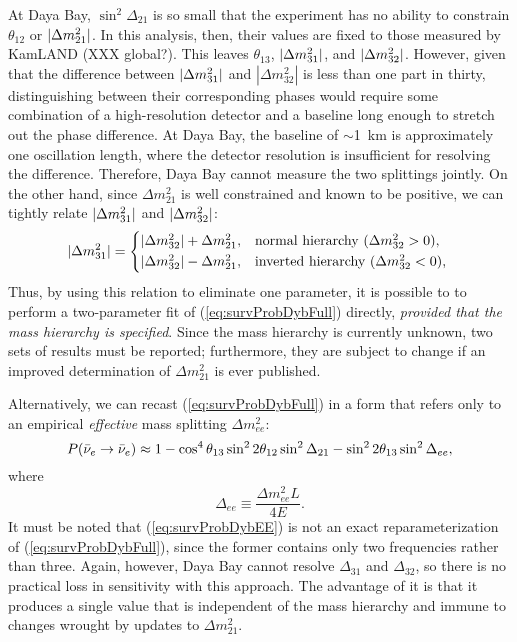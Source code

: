 \documentclass[../thesis.tex]{subfiles}
\begin{document}
At Daya Bay, $\sin^2 \Delta_{21}$ is so small that the experiment has no ability to constrain $\theta_{12}$ or $\lvert \Delta m^2_{21}\rvert$. In this analysis, then, their values are fixed to those measured by KamLAND (XXX global?). This leaves $\theta_{13}$, $\lvert \Delta m^2_{31}\rvert$, and $\lvert \Delta m^2_{32}\rvert$. However, given that the difference between $\lvert \Delta m^2_{31}\rvert$ and $|\Delta m^2_{32}|$ is less than one part in thirty, distinguishing between their corresponding phases would require some combination of a high-resolution detector and a baseline long enough to stretch out the phase difference. At Daya Bay, the baseline of $\sim$1~km is approximately one oscillation length, where the detector resolution is insufficient for resolving the difference. Therefore, Daya Bay cannot measure the two splittings jointly. On the other hand, since $\Delta m^2_{21}$ is well constrained and known to be positive, we can tightly relate $\lvert \Delta m^2_{31}\rvert$ and $\lvert \Delta m^2_{32}\rvert$:
\[ \abs{\Delta m^2_{31}} =
  \begin{cases*}
    \abs{\Delta m^2_{32}} + \Delta m^2_{21}, & normal hierarchy ($\Delta m^2_{32} > 0$), \\
    \abs{\Delta m^2_{32}} - \Delta m^2_{21}, & inverted hierarchy ($\Delta m^2_{32} < 0$), \\
  \end{cases*}
\]
Thus, by using this relation to eliminate one parameter, it is possible to to perform a two-parameter fit of (\ref{eq:survProbDybFull}) directly, \emph{provided that the mass hierarchy is specified}. Since the mass hierarchy is currently unknown, two sets of results must be reported; furthermore, they are subject to change if an improved determination of $\Delta m^2_{21}$ is ever published.

Alternatively, we can recast (\ref{eq:survProbDybFull}) in a form that refers only to an empirical \emph{effective} mass splitting $\Delta m^2_{ee}$:
\begin{equation}
  \label{eq:survProbDybEE}
  P(\bar\nu_e \rightarrow \bar\nu_e) \approx 1 - \cos^4\theta_{13}\sin^2 2\theta_{12} \sin^2 \Delta_{21}
  - \sin^2 2\theta_{13}\sin^2\Delta_{ee},
\end{equation}
where
\[ \Delta_{ee} \equiv \frac{\Delta m^2_{ee}L}{4E}. \]
It must be noted that (\ref{eq:survProbDybEE}) is not an exact reparameterization of (\ref{eq:survProbDybFull}), since the former contains only two frequencies rather than three. Again, however, Daya Bay cannot resolve $\Delta_{31}$ and $\Delta_{32}$, so there is no practical loss in sensitivity with this approach. The advantage of it is that it produces a single value that is independent of the mass hierarchy and immune to changes wrought by updates to $\Delta m^2_{21}$.
\end{document}
